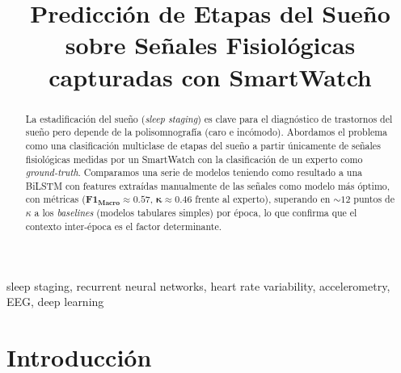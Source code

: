 \documentclass[conference]{IEEEtran}
\begin{document}
\title{Predicción de Etapas del Sueño sobre Señales Fisiológicas capturadas con SmartWatch\\
}

\author{
\and
{}
}

\maketitle

\begin{abstract}
La estadificación del sueño (\emph{sleep staging}) es clave para el diagnóstico de trastornos del sueño pero depende de la polisomnografía (caro e incómodo). Abordamos el problema como una clasificación multiclase de etapas del sueño a partir únicamente de señales fisiológicas medidas por un SmartWatch con la clasificación de un experto como \emph{ground-truth}. Comparamos una serie de modelos teniendo como resultado a una BiLSTM con features extraídas manualmente de las señales como modelo más óptimo, con métricas ($\boldsymbol{F1_{Macro}\approx0.57}$, $\boldsymbol{\kappa\approx0.46}$ frente al experto), superando en $\sim\!12$ puntos de $\kappa$ a los \emph{baselines} (modelos tabulares simples) por época, lo que confirma que el contexto inter-época es el factor determinante.
\end{abstract}

\begin{IEEEkeywords}
sleep staging, recurrent neural networks, heart rate variability, accelerometry, EEG, deep learning
\end{IEEEkeywords}

\section{Introducción}
\end{document}
